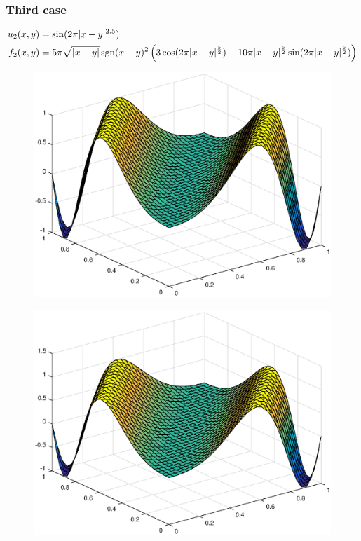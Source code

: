 \documentclass[main.tex]{subfiles}
\begin{document}
\subsubsection*{Third case}
\begin{align}
    u_{2}(x,y) &= \sin(2 \pi |x-y|^{2.5}) \\
    f_2(x,y) &= 5 \pi \sqrt{|x-y|} \operatorname{sgn}(x-y)^2 \left(3 \cos(2 \pi |x-y|^{\frac{5}{2}}) - 10 \pi |x-y|^{\frac{5}{2}} \sin(2 \pi |x-y|^{\frac{5}{2}}) \right)
\end{align}

\begin{figure}[h]
\centering
\begin{minipage}{.5\textwidth}
  \centering
  \includegraphics[width=.9\linewidth]{../Figures/ex2u2exact}
  \label{fig:ex2:u2exact}
\end{minipage}%
\begin{minipage}{.5\textwidth}
  \centering
  \includegraphics[width=.9\linewidth]{../Figures/ex2u2calc}
  \label{fig:ex2:u2calc}
\end{minipage}
\end{figure}
\end{document}

